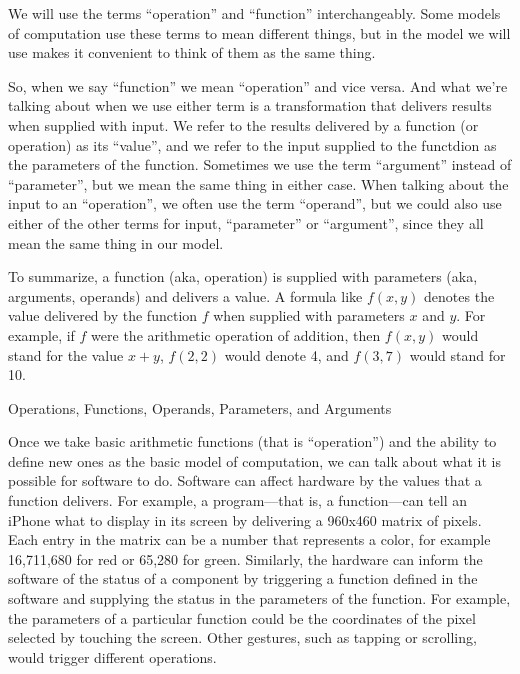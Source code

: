 \begin{aside}
We will use the terms ``operation'' and ``function'' interchangeably. 
Some models of computation use these terms to mean different things, but in the model we will use makes it convenient to think of them as the same thing.

So, when we say ``function'' we mean ``operation'' and vice versa. And what we're talking about when we use either term is a transformation that delivers results when supplied with input. We refer to the results delivered by a function (or operation) as its ``value'', and we refer to the input supplied to the functdion as the parameters of the function. Sometimes we use the term ``argument'' instead of ``parameter'', but we mean the same thing in either case. When talking about the input to an ``operation'', we often use the term ``operand'', but we could also use either of the other terms for input, ``parameter'' or ``argument'', since they all mean the same thing in our model. 

To summarize, a function (aka, operation) is supplied with parameters (aka, arguments, operands) and delivers a value.
A formula like $f(x,y)$ denotes the value delivered by the function $f$ when supplied with parameters $x$ and $y$. For example, if $f$ were the arithmetic operation of addition, then $f(x,y)$ would stand for the value $x+y$, $f(2,2)$ would denote 4, and $f(3,7)$ would stand for 10.

\caption{Operations, Functions, Operands, Parameters, and Arguments}
\label{operations-and-functions}
\end{aside}

Once we take basic arithmetic functions (that is ``operation'') and the ability to define new ones
as the basic model of computation, we can talk about what it is possible for software to do. 
Software can affect
hardware by the values that a function delivers.  For example,
a program---that is, a function---can tell an iPhone what to display
in its screen by delivering a 960x460 matrix of pixels.  Each entry in the matrix
can be a number that represents a color, for example 16,711,680 for
red or 65,280 for green.  Similarly, the hardware can inform the
software of the status of a component by triggering a function defined in the software and supplying the status in the parameters of the function.
For example, the parameters of a particular function could be the coordinates of the pixel selected by touching the screen.  Other gestures, such as tapping or
scrolling, would trigger different operations.

